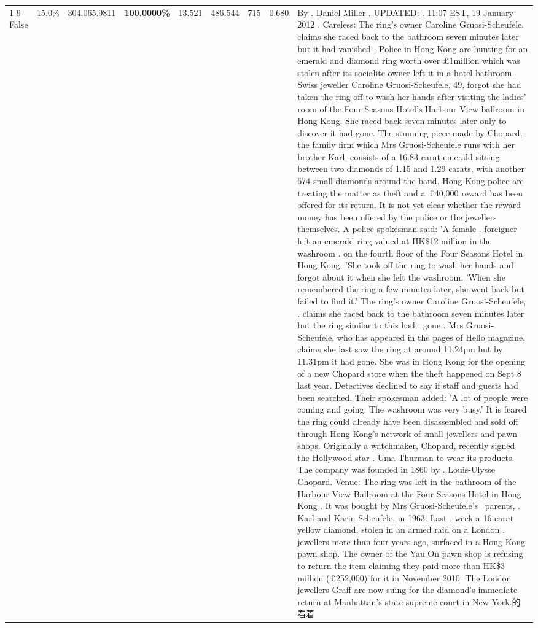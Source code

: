 \begin{table}[H]
\begin{tabular}{lllrlllll}
\cline{1-9}
False & 15.0\% & \color{red} 304,065.9811 & \bfseries \color{red} 100.0000\% & 13.521 & 486.544 & 715 & 0.680 & By . Daniel Miller . UPDATED: . 11:07 EST, 19 January 2012 . Careless: The ring's owner Caroline Gruosi-Scheufele, claims she raced back to the bathroom seven minutes later but it had vanished . Police in Hong Kong are hunting for an emerald and diamond ring worth over £1million which was stolen after its socialite owner left it in a hotel bathroom. Swiss jeweller Caroline Gruosi-Scheufele, 49, forgot she had taken the ring off to wash her hands after visiting the ladies' room of the Four Seasons Hotel's Harbour View ballroom in Hong Kong. She raced back seven minutes later only to discover it had gone. The stunning piece made by Chopard, the family firm which Mrs Gruosi-Scheufele runs with her brother Karl, consists of a 16.83 carat emerald sitting between two diamonds of 1.15 and 1.29 carats, with another 674 small diamonds around the band. Hong Kong police are treating the matter as theft and a £40,000 reward has been offered for its return. It is not yet clear whether the reward money has been offered by the police or the jewellers themselves. A police spokesman said: 'A female . foreigner left an emerald ring valued at HK\$12 million in the washroom . on the fourth floor of the Four Seasons Hotel in Hong Kong. 'She took off the ring to wash her hands and forgot about it when she left the washroom. 'When she remembered the ring a few minutes later, she went back but failed to find it.' The ring's owner Caroline Gruosi-Scheufele, . claims she raced back to the bathroom seven minutes later but the ring similar to this had . gone . Mrs Gruosi-Scheufele, who has appeared in the pages of Hello magazine, claims she last saw the ring at around 11.24pm but by 11.31pm it had gone. She was in Hong Kong for the opening of a new Chopard store when the theft happened on Sept 8 last year. Detectives declined to say if staff and guests had been searched. Their spokesman added: 'A lot of people were coming and going. The washroom was very busy.' It is feared the ring could already have been disassembled and sold off through Hong Kong's network of small jewellers and pawn shops. Originally a watchmaker, Chopard, recently signed the Hollywood star . Uma Thurman to wear its products. The company was founded in 1860 by . Louis-Ulysse Chopard. Venue: The ring was left in the bathroom of the Harbour View Ballroom at the Four Seasons Hotel in Hong Kong . It was bought by Mrs Gruosi-Scheufele's  parents, . Karl and Karin Scheufele, in 1963. Last . week a 16-carat yellow diamond, stolen in an armed raid on a London . jewellers more than four years ago, surfaced in a Hong Kong pawn shop. The owner of the Yau On pawn shop is refusing to return the item claiming they paid more than HK\$3 million (£252,000) for it in November 2010. The London jewellers Graff are now suing for the diamond’s immediate return at Manhattan’s state supreme court in New York.的看着 \\

\end{tabular}
\end{table}
